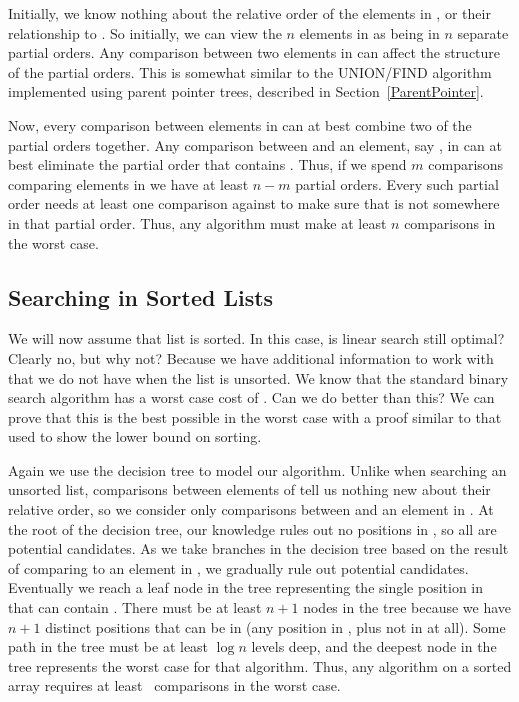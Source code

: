 \begin{numproof}{3}
Initially, we know nothing about the relative order of the
elements in , or their relationship to .
So initially, we can view the \(n\) elements in  as being in
\(n\) separate partial orders.
Any comparison between two elements in  can affect the
structure of the partial orders.
This is somewhat similar to the UNION/FIND algorithm implemented using
parent pointer trees, described in Section~\ref{ParentPointer}.

Now, every comparison between elements in  can at best combine
two of the partial orders together.
Any comparison between  and an element, say , in
 can at best eliminate the partial order that contains
.
Thus, if we spend \(m\) comparisons comparing elements in  we
have at least \(n-m\) partial orders.
Every such partial order needs at least one comparison against
 to make sure that  is not somewhere in that partial
order.
Thus, any algorithm must make at least \(n\) comparisons in the worst
case.
\end{numproof}

\subsection{Searching in Sorted Lists}

We will now assume that list  is sorted.
In this case, is linear search still optimal?
Clearly no, but why not?
Because we have additional information to work with that we do not
have when the list is unsorted.
We know that the standard binary search algorithm has a worst case cost
of \Ologn.
Can we do better than this?
We can prove that this is the best possible in the worst case with a
proof similar to that used to show the lower bound on sorting.

Again we use the decision tree to model our
algorithm.
Unlike when searching an unsorted list, comparisons between elements
of  tell us nothing new about their relative order, so we
consider only comparisons between  and an element in .
At the root of the decision tree, our knowledge rules out no positions
in , so all are potential candidates.
As we take branches in the decision tree based on the result of
comparing  to an element in , we gradually rule out
potential candidates.
Eventually we reach a leaf node in the tree representing the single
position in  that can contain .
There must be at least \(n+1\) nodes in the tree because we have \(n+1\)
distinct positions that  can be in (any position in ,
plus not in  at all).
Some path in the tree must be at least \(\log n\) levels deep, and the
deepest node in the tree represents the worst case for that algorithm.
Thus, any algorithm on a sorted array requires at least \Omegalogn\
comparisons in the worst case.

